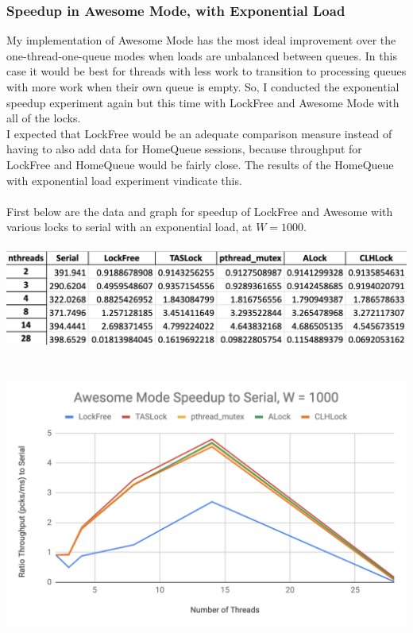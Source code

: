 \documentclass{article}
\begin{document}
\begin{adjustwidth}{-2cm}{-2cm}
\subsubsection{Speedup in Awesome Mode, with Exponential Load}
My implementation of Awesome Mode has the most ideal improvement over the one-thread-one-queue modes when loads are unbalanced between queues. In this case it would be best for threads with less work to transition to processing queues with more work when their own queue is empty. So, I conducted the exponential speedup experiment again but this time with LockFree and Awesome Mode with all of the locks.\\
I expected that LockFree would be an adequate comparison measure instead of having to also add data for HomeQueue sessions, because throughput for LockFree and HomeQueue would be fairly close. The results of the HomeQueue with exponential load experiment vindicate this.\\
\null\\First below are the data and graph for speedup of LockFree and Awesome with various locks to serial with an exponential load, at $W=1000$.\\
\null\\
\includegraphics[width=\linewidth]{b_awe1000Data.png}\\ \null\\
\null\\
\includegraphics[width=\linewidth]{b_awe1000Graph.png}\\ \null\\

\end{adjustwidth}
\end{document}
